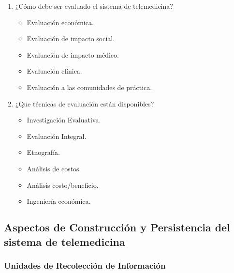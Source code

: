 \begin{enumerate}
\item ¿Cómo debe ser evaluado el sistema de telemedicina?

\begin{itemize}
\item Evaluación económica.
\item Evaluación de impacto social.
\item Evaluación de impacto médico.
\item Evaluación clínica.
\item Evaluación a las comunidades de práctica.
\end{itemize}

\item ¿Que técnicas de evaluación están disponibles?

\begin{itemize}
\item Investigación Evaluativa.
\item Evaluación Integral.
\item Etnografía.
\item Análisis de costos.
\item Análisis costo/beneficio.
\item Ingeniería económica.
\end{itemize}

\end{enumerate}


\subsection{Aspectos de Construcción y Persistencia del sistema de telemedicina}

\subsubsection{Unidades de Recolección de Información}

